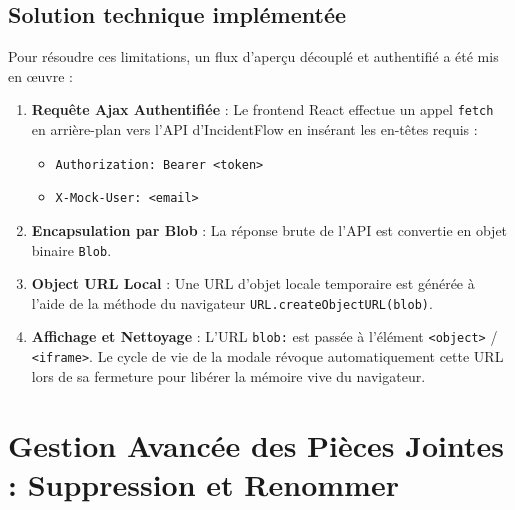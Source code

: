 \documentclass[12pt,a4paper]{article}
\begin{document}
\subsection{Solution technique implémentée}
Pour résoudre ces limitations, un flux d'aperçu découplé et authentifié a été mis en œuvre :
\begin{enumerate}
    \item \textbf{Requête Ajax Authentifiée} : Le frontend React effectue un appel \texttt{fetch} en arrière-plan vers l'API d'IncidentFlow en insérant les en-têtes requis :
    \begin{itemize}
        \item \texttt{Authorization: Bearer <token>}
        \item \texttt{X-Mock-User: <email>}
    \end{itemize}
    \item \textbf{Encapsulation par Blob} : La réponse brute de l'API est convertie en objet binaire \texttt{Blob}.
    \item \textbf{Object URL Local} : Une URL d'objet locale temporaire est générée à l'aide de la méthode du navigateur \texttt{URL.createObjectURL(blob)}.
    \item \textbf{Affichage et Nettoyage} : L'URL \texttt{blob:} est passée à l'élément \texttt{<object>} / \texttt{<iframe>}. Le cycle de vie de la modale révoque automatiquement cette URL lors de sa fermeture pour libérer la mémoire vive du navigateur.
\end{enumerate}

\section{Gestion Avancée des Pièces Jointes : Suppression et Renommer}
\end{document}
